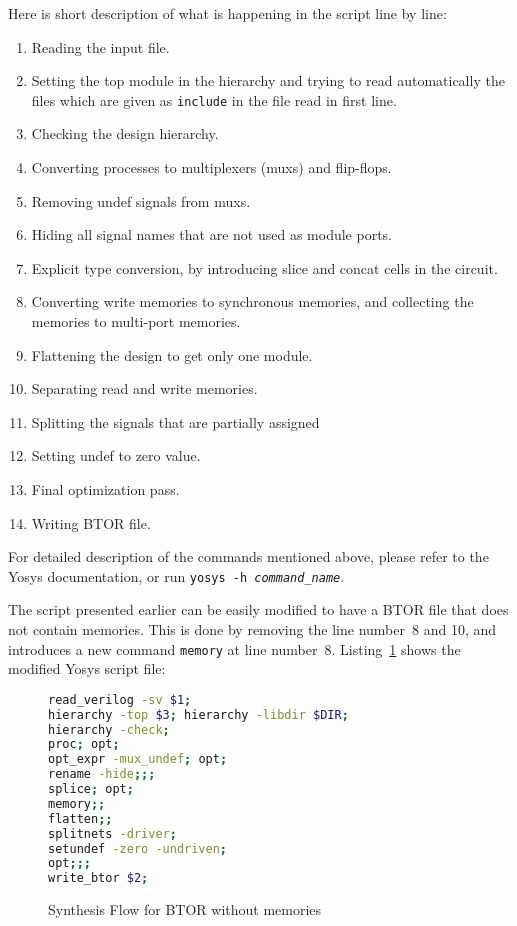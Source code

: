 \documentclass[9pt,technote,a4paper]{IEEEtran}
\begin{document}
Here is short description of what is happening in the script line by
line:

\begin{enumerate}
\item Reading the input file.
\item Setting the top module in the hierarchy and trying to read
  automatically the files which are given as {\tt include} in the file
  read in first line.
\item Checking the design hierarchy.
\item Converting processes to multiplexers (muxs) and flip-flops.
\item Removing undef signals from muxs.
\item Hiding all signal names that are not used as module ports.
\item Explicit type conversion, by introducing slice and concat cells
  in the circuit.
\item Converting write memories to synchronous memories, and
  collecting the memories to multi-port memories.
\item Flattening the design to get only one module.
\item Separating read and write memories.
\item Splitting the signals that are partially assigned
\item Setting undef to zero value.
\item Final optimization pass.
\item Writing BTOR file.
\end{enumerate}

For detailed description of the commands mentioned above, please refer
to the Yosys documentation, or run {\tt yosys -h \it command\_name}.

The script presented earlier can be easily modified to have a BTOR
file that does not contain memories. This is done by removing the line
number~8 and 10, and introduces a new command {\tt memory} at line
number~8. Listing~\ref{btor_script_without_memory} shows the
modified Yosys script file:

\begin{figure}[H]
\begin{lstlisting}[language=sh,numbers=none]
read_verilog -sv $1;
hierarchy -top $3; hierarchy -libdir $DIR;
hierarchy -check;
proc; opt;
opt_expr -mux_undef; opt;
rename -hide;;;
splice; opt;
memory;;
flatten;;
splitnets -driver;
setundef -zero -undriven;
opt;;;
write_btor $2;
\end{lstlisting}
 \renewcommand{\figurename}{Listing}
\caption{Synthesis Flow for BTOR without memories}
\label{btor_script_without_memory}
\end{figure}
\end{document}
